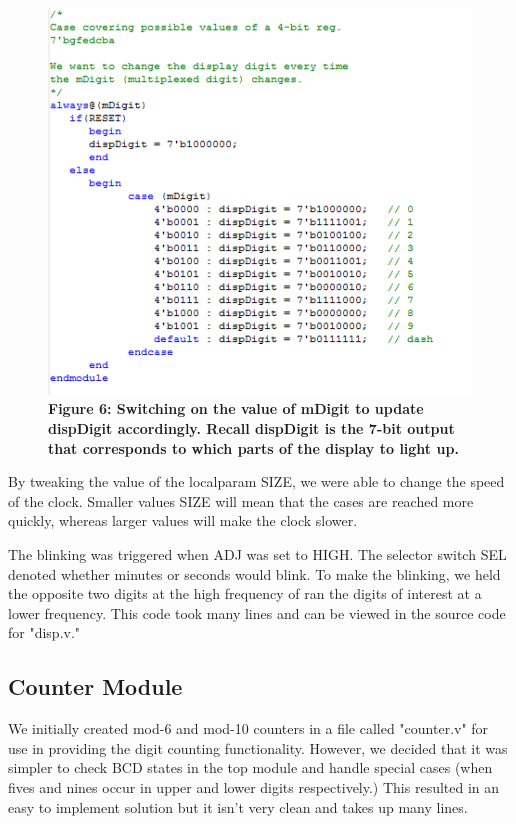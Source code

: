 \documentclass[journal]{IEEEtran}
\begin{document}
\begin{figure}[H]
	\centering\includegraphics[scale=0.6]{changedisp}
	\caption{\textbf{Figure 6: Switching on the value of mDigit to update dispDigit accordingly. Recall dispDigit is the 7-bit output that corresponds to which parts of the display to light up.}}
\end{figure}
By tweaking the value of the localparam SIZE, we were able to change the speed of the clock. Smaller values SIZE will mean that the cases are reached more quickly, whereas larger values will make the clock slower.
\par
The blinking was triggered when ADJ was set to HIGH. The selector switch SEL denoted whether minutes or seconds would blink. To make the blinking, we held the opposite two digits at the high frequency of ran the digits of interest at a lower frequency. This code took many lines and can be viewed in the source code for "disp.v."
\subsection{Counter Module}
We initially created mod-6 and mod-10 counters in a file called "counter.v" for use in providing the digit counting functionality. However, we decided that it was simpler to check BCD states in the top module and handle special cases (when fives and nines occur in upper and lower digits respectively.) This resulted in an easy to implement solution but it isn't very clean and takes up many lines.
\end{document}
